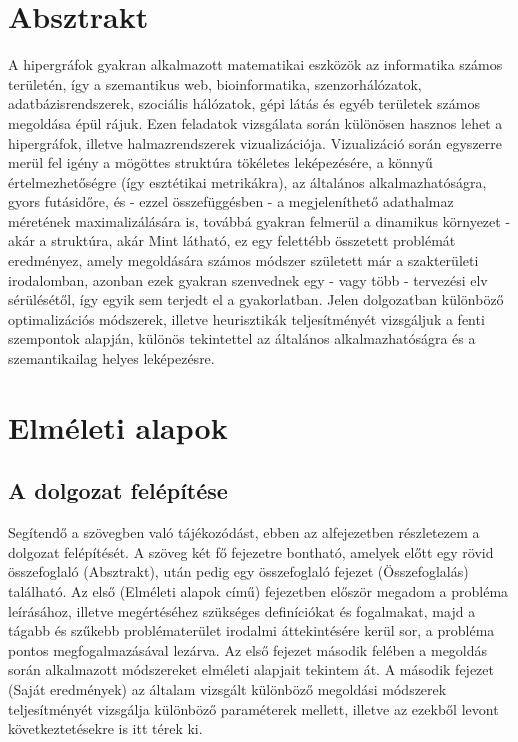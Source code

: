 

\chapter{Absztrakt}

A hipergráfok gyakran alkalmazott matematikai eszközök az informatika számos területén, így a szemantikus web, bioinformatika, szenzorhálózatok, adatbázisrendszerek, szociális hálózatok, gépi látás és egyéb területek számos megoldása épül rájuk.
Ezen feladatok vizsgálata során különösen hasznos lehet a hipergráfok, illetve halmazrendszerek vizualizációja. Vizualizáció során egyszerre merül fel igény a mögöttes struktúra tökéletes leképezésére, a könnyű értelmezhetőségre (így esztétikai metrikákra), az általános alkalmazhatóságra, gyors futásidőre, és - ezzel összefüggésben - a megjeleníthető adathalmaz méretének maximalizálására is, továbbá gyakran felmerül a dinamikus környezet - akár a struktúra, akár 
Mint látható, ez egy felettébb összetett problémát eredményez, amely megoldására számos módszer született már a szakterületi irodalomban, azonban ezek gyakran szenvednek egy - vagy több - tervezési elv sérülésétől, így egyik sem terjedt el a gyakorlatban.
Jelen dolgozatban különböző optimalizációs módszerek, illetve heurisztikák teljesítményét vizsgáljuk a fenti szempontok alapján, különös tekintettel az általános alkalmazhatóságra és a szemantikailag helyes leképezésre.

\chapter{Elméleti alapok}
\label{ch:intro}

\section{A dolgozat felépítése}

Segítendő a szövegben való tájékozódást, ebben az alfejezetben részletezem a dolgozat felépítését. A szöveg két fő fejezetre bontható, amelyek előtt egy rövid összefoglaló (Absztrakt), után pedig egy összefoglaló fejezet (Összefoglalás) található. Az első (Elméleti alapok című) fejezetben először megadom a probléma leírásához, illetve megértéséhez szükséges definíciókat és fogalmakat, majd a tágabb és szűkebb problématerület irodalmi áttekintésére kerül sor, a probléma pontos megfogalmazásával lezárva. Az első fejezet második felében a megoldás során alkalmazott módszereket elméleti alapjait tekintem át. A második fejezet (Saját eredmények) az általam vizsgált különböző megoldási módszerek teljesítményét vizsgálja különböző paraméterek mellett, illetve az ezekből levont következtetésekre is itt térek ki.


